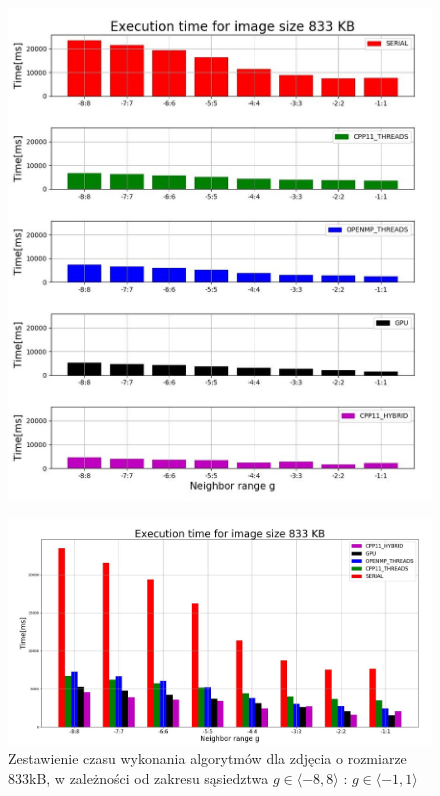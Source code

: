 \documentclass[document.tex]{subfiles}
\begin{document}
\clearpage
\begin{figure}[h]
\includegraphics[scale=0.6]{imgs/plot2_pc.jpg}
\caption*{}
\label{fig:results_pc_hybrid}
\end{figure}
\clearpage
\begin{figure}[h]
\includegraphics[scale=0.35]{imgs/plot6_pc.jpg}
\caption{Zestawienie czasu wykonania algorytmów dla zdjęcia o rozmiarze 833kB, 
        w zależności od zakresu sąsiedztwa $g\in \langle -8, 8 \rangle$ : $g\in \langle -1, 1 \rangle$ }
\label{fig:results_pc_hybrid}
\end{figure}
\end{document}
